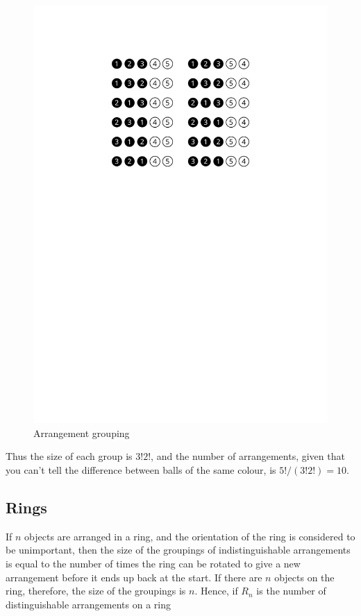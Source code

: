 \documentclass[a5paper]{article}
\begin{document}
\begin{figure}[ht]
  \begin{center}
    \includegraphics{arrangement-grouping}
  \end{center}

  \caption{Arrangement grouping}
  \label{fig:2}
\end{figure}

Thus the size of each group is $3!2!$, and the number of arrangements, given
that you can't tell the difference between balls of the same colour, is
$5!/(3!2!) = 10$.

\subsection{Rings}

If $n$ objects are arranged in a ring, and the orientation of the ring is
considered to be unimportant, then the size of the groupings of
indistinguishable arrangements is equal to the number of times the ring can be
rotated to give a new arrangement before it ends up back at the start. If there
are $n$ objects on the ring, therefore, the size of the groupings is $n$.
Hence, if $R_n$ is the number of distinguishable arrangements on a ring
\end{document}
